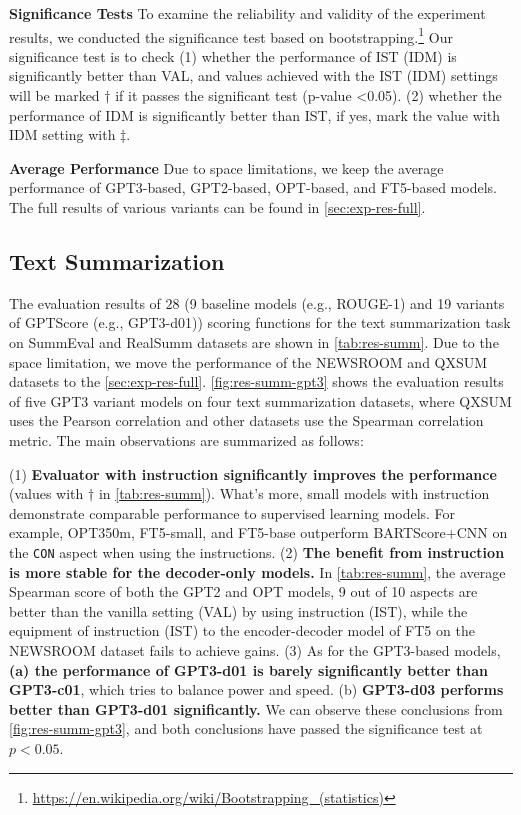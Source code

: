 \textbf{Significance Tests} To examine the reliability and validity of the experiment results, we conducted the significance test based on bootstrapping.\footnote{\url{https://en.wikipedia.org/wiki/Bootstrapping_(statistics)}}
Our significance test is to check (1) whether the performance of IST (IDM) is significantly better than VAL, and values achieved with the IST (IDM) settings will be marked $\dag$ if it passes the significant test (p-value <0.05). (2) whether the performance of IDM is significantly better than IST, if yes, mark the value with IDM setting with $\ddag$.

\textbf{Average Performance} Due to space limitations, we keep the average performance of GPT3-based, GPT2-based, OPT-based, and FT5-based models. The full results of various variants can be found in \autoref{sec:exp-res-full}.

\subsection{Text Summarization} The evaluation results of $28$ (9 baseline models (e.g., ROUGE-1) and 19 variants of GPTScore (e.g., GPT3-d01)) scoring functions for the text summarization task on SummEval and RealSumm datasets are shown in \autoref{tab:res-summ}. Due to the space limitation, we move the performance of the NEWSROOM and QXSUM datasets to the \autoref{sec:exp-res-full}.    
\autoref{fig:res-summ-gpt3} shows the evaluation results of five GPT3 variant models on four text summarization datasets, where QXSUM uses the Pearson correlation and other datasets use the Spearman correlation metric. The main observations are summarized as follows:

    (1) \textbf{Evaluator with instruction significantly improves the performance} (values with $\dag$ in \autoref{tab:res-summ}). What's more, small models with instruction demonstrate comparable performance to supervised learning models. For example, OPT350m, FT5-small, and FT5-base outperform BARTScore+CNN on the \texttt{CON} aspect when using the instructions. (2) \textbf{The benefit from instruction is more stable for the decoder-only models.} In \autoref{tab:res-summ}, the average Spearman score of both the GPT2 and OPT models, 9 out of 10 aspects are better than the vanilla setting (VAL)  by using instruction (IST), while the equipment of instruction (IST) to the encoder-decoder model of FT5 on the NEWSROOM dataset fails to achieve gains. (3) As for the GPT3-based models, \textbf{(a) the performance of GPT3-d01 is barely significantly better than GPT3-c01}, which tries to balance power and speed. (b) \textbf{GPT3-d03 performs better than GPT3-d01 significantly.} We can observe these conclusions from \autoref{fig:res-summ-gpt3}, and both conclusions have passed the significance test at $p<0.05$.

